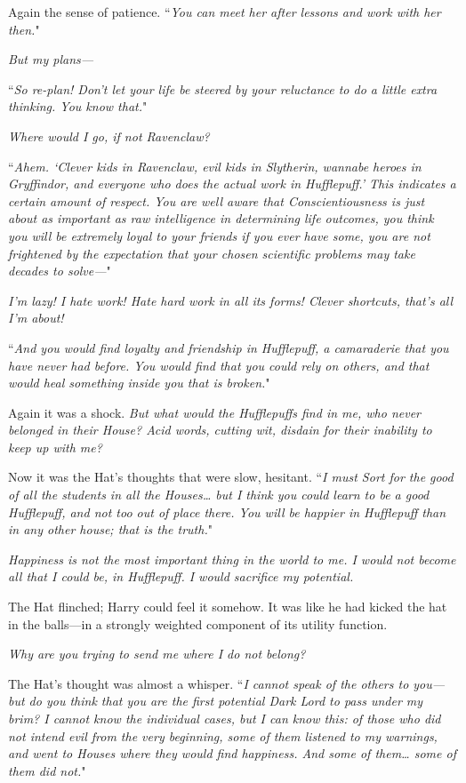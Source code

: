 Again the sense of patience. ``\emph{You can meet her after lessons and work with her then.}"

\emph{But my plans—}

``\emph{So re-plan! Don't let your life be steered by your reluctance to do a little extra thinking. You \emph{know} that.}"

\emph{Where would I go, if not Ravenclaw?}

``\emph{Ahem. `Clever kids in Ravenclaw, evil kids in Slytherin, wannabe heroes in Gryffindor, and everyone who does the actual work in Hufflepuff.' This indicates a certain amount of respect. You are well aware that Conscientiousness is just about as important as raw intelligence in determining life outcomes, you think you will be extremely loyal to your friends if you ever have some, you are not frightened by the expectation that your chosen scientific problems may take decades to solve—}"

\emph{I'm lazy! I hate work! Hate hard work in all its forms! Clever shortcuts, that's all I'm about!}

``\emph{And you would find loyalty and friendship in Hufflepuff, a camaraderie that you have never had before. You would find that you could rely on others, and that would heal something inside you that is broken.}"

Again it was a shock. \emph{But what would the Hufflepuffs find in \emph{me}, who never belonged in their House? Acid words, cutting wit, disdain for their inability to keep up with me?}

Now it was the Hat's thoughts that were slow, hesitant. ``\emph{I must Sort for the good of all the students in all the Houses{\ldots} but I think you could learn to be a good Hufflepuff, and not too out of place there. You will be happier in Hufflepuff than in any other house; that is the truth.}"

\emph{Happiness is not the most important thing in the world to me. I would not become all that I could be, in Hufflepuff. I would sacrifice my potential.}

The Hat flinched; Harry could feel it somehow. It was like he had kicked the hat in the balls—in a strongly weighted component of its utility function.

\emph{Why are you trying to send me where I do not belong?}

The Hat's thought was almost a whisper. ``\emph{I cannot speak of the others to you—but do you think that you are the first potential Dark Lord to pass under my brim? I cannot know the individual cases, but I can know this: of those who did not intend evil from the very beginning, some of them listened to my warnings, and went to Houses where they would find happiness. And some of them{\ldots} some of them did not.}"

